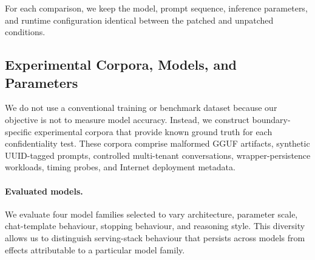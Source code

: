 For each comparison, we keep the model, prompt sequence, inference
parameters, and runtime configuration identical between the patched and
unpatched conditions.


\subsection{Experimental Corpora, Models, and Parameters}
\label{app:models_parameters}

We do not use a conventional training or benchmark dataset because our
objective is not to measure model accuracy. Instead, we construct
boundary-specific experimental corpora that provide known ground truth
for each confidentiality test. These corpora comprise malformed GGUF
artifacts, synthetic UUID-tagged prompts, controlled multi-tenant
conversations, wrapper-persistence workloads, timing probes, and
Internet deployment metadata.

\paragraph{Evaluated models.}
We evaluate four model families selected to vary architecture, parameter
scale, chat-template behaviour, stopping behaviour, and reasoning style.
This diversity allows us to distinguish serving-stack behaviour that
persists across models from effects attributable to a particular model
family.

\begin{table}[!t]
    \centering
    \caption{Models used throughout the boundary-oriented
    evaluation.}
    \label{tab:evaluated_models}
    \footnotesize
    \setlength{\tabcolsep}{4pt}
\end{table}

